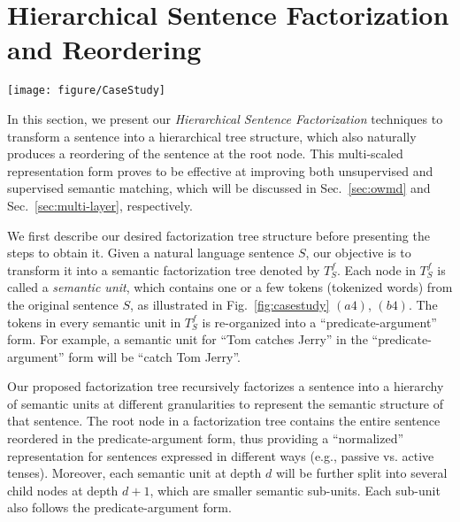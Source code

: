 \section{Hierarchical Sentence Factorization and Reordering}
\label{sec:sentence}


\begin{figure*}[tb]
\centering
\texttt{[image: figure/CaseStudy]}
\vspace{-3mm}
\caption{An example of the sentence factorization process. Here we show: A. The original sentence pair; B. The procedures of creating sentence factorization trees; C. The predicate-argument form of original sentence pair; D. The alignment of semantic units with the reordered form.}
\label{fig:casestudy}
\vspace{-1mm}
\end{figure*}

In this section, we present our \textit{Hierarchical Sentence Factorization} techniques to transform a sentence into a hierarchical tree structure, which also naturally produces a reordering of the sentence at the root node. 
This multi-scaled representation form proves to be effective at improving both unsupervised and supervised semantic matching, which will be discussed in Sec.~\ref{sec:owmd} and Sec.~\ref{sec:multi-layer}, respectively. 

We first describe our desired factorization tree structure before presenting the steps to obtain it. Given a natural language sentence $S$, our objective is to transform it into a semantic factorization tree denoted by $T^f_S$. Each node in $T^f_S$ is called a \textit{semantic unit}, which contains one or a few tokens (tokenized words) from the original sentence $S$, as illustrated in Fig.~\ref{fig:casestudy} $(a4)$, $(b4)$.
The tokens in every semantic unit in $T^f_S$ is re-organized into a ``predicate-argument'' form. For example, a semantic unit for ``Tom catches Jerry'' in the ``predicate-argument'' form will be ``catch Tom Jerry''.

Our proposed factorization tree recursively factorizes a sentence into a hierarchy of semantic units at different granularities to represent the semantic structure of that sentence.
The root node in a factorization tree contains the entire sentence reordered in the predicate-argument form, thus providing a ``normalized'' representation for sentences expressed in different ways (e.g., passive vs. active tenses). Moreover, each semantic unit at depth $d$ will be further split into several child nodes at depth $d + 1$, which are smaller semantic sub-units. Each sub-unit also follows the predicate-argument form.

